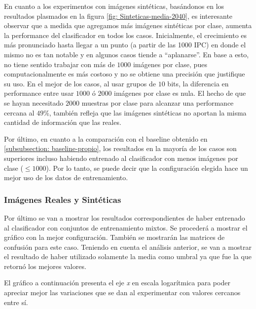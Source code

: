 	En cuanto a los experimentos con imágenes sintéticas, basándonos en los resultados plasmados en la figura \ref{fig: Sinteticas-media-2040}, es interesante observar que a medida que agregamos más imágenes sintéticas por clase, aumenta la performance del clasificador en todos los casos. Inicialmente, el crecimiento es más pronunciado hasta llegar a un punto (a partir de las 1000 IPC) en donde el mismo no es tan notable y en algunos casos tiende a ``aplanarse''. En base a esto, no tiene sentido trabajar con más de $1000$ imágenes por clase, pues computacionalmente es más costoso y no se obtiene una precisión que justifique su uso. En el mejor de los casos, al usar grupos de $10$ bits, la diferencia en performance entre usar $1000$ ó $2000$ imágenes por clase es nula. El hecho de que se hayan necesitado $2000$ muestras por clase para alcanzar una performance cercana al $49\%$, también refleja que las imágenes sintéticas no aportan la misma cantidad de información que las reales.

	Por último, en cuanto a la comparación con el baseline obtenido en \ref{subsubsection: baseline-propio}, los resultados en la mayoría de los casos son superiores incluso habiendo entrenado al clasificador con menos imágenes por clase ($\leq 1000$). Por lo tanto, se puede decir que la configuración elegida hace un mejor uso de los datos de entrenamiento.

\newpage
    	\subsubsection{Imágenes Reales y Sintéticas}

	Por último se van a mostrar los resultados correspondientes de haber entrenado al clasificador con conjuntos de entrenamiento mixtos. Se procederá a mostrar el gráfico con la mejor configuración. También se mostrarán las matrices de confusión para este caso. Teniendo en cuenta el análisis anterior, se van a mostrar el resultado de haber utilizado solamente la media como umbral ya que fue la que retornó los mejores valores.

	El gráfico a continuación presenta el eje \textit{x} en escala logarítmica para poder apreciar mejor las variaciones que se dan al experimentar con valores cercanos entre sí.

